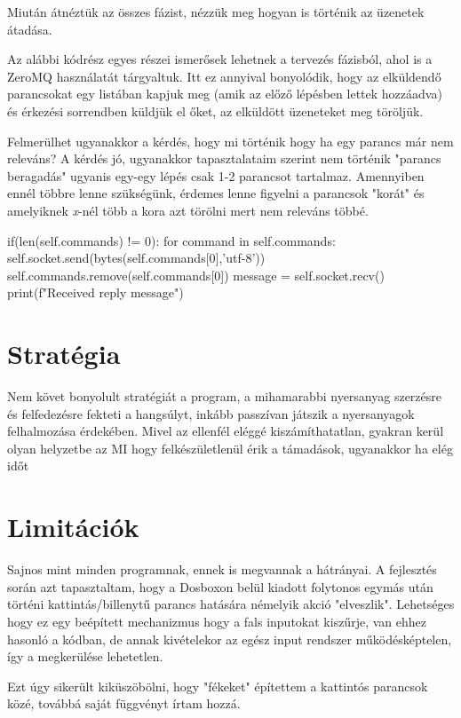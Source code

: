 Miután átnéztük az összes fázist, nézzük meg hogyan is történik az üzenetek átadása.

Az alábbi kódrész egyes részei ismerősek lehetnek a tervezés fázisból, ahol is a ZeroMQ használatát tárgyaltuk. Itt ez annyival bonyolódik, hogy az elküldendő parancsokat egy listában kapjuk meg (amik az előző lépésben lettek hozzáadva) és érkezési sorrendben küldjük el őket, az elküldött üzeneteket meg töröljük.

Felmerülhet ugyanakkor a kérdés, hogy mi történik hogy ha egy parancs már nem releváns? A kérdés jó, ugyanakkor tapasztalataim szerint nem történik "parancs beragadás" ugyanis egy-egy lépés csak 1-2 parancsot tartalmaz. Amennyiben ennél többre lenne szükségünk, érdemes lenne figyelni a parancsok "korát" és amelyiknek \textit{x}-nél több a kora azt törölni mert nem releváns többé.

\begin{python}
if(len(self.commands) != 0):
    for command in self.commands:
        self.socket.send(bytes(self.commands[0],'utf-8'))
        self.commands.remove(self.commands[0])
        message = self.socket.recv()
        print(f"Received reply {message}")
\end{python}
\section{Stratégia}

Nem követ bonyolult stratégiát a program, a mihamarabbi nyersanyag szerzésre és felfedezésre fekteti a hangsúlyt, inkább passzívan játszik a nyersanyagok felhalmozása érdekében. Mivel az ellenfél eléggé kiszámíthatatlan, gyakran kerül olyan helyzetbe az MI hogy felkészületlenül érik a támadások, ugyanakkor ha elég időt 
\section{Limitációk}

Sajnos mint minden programnak, ennek is megvannak a hátrányai. A fejlesztés során azt tapasztaltam, hogy a Dosboxon belül kiadott folytonos egymás után történi kattintás/billenytű parancs hatására némelyik akció "elveszlik". Lehetséges hogy ez egy beépített mechanizmus hogy a fals inputokat kiszűrje, van ehhez hasonló a kódban, de annak kivételekor az egész input rendszer működésképtelen, így a megkerülése lehetetlen.

Ezt úgy sikerült kiküszöbölni, hogy "fékeket" építettem a kattintós parancsok közé, továbbá saját függvényt írtam hozzá.

